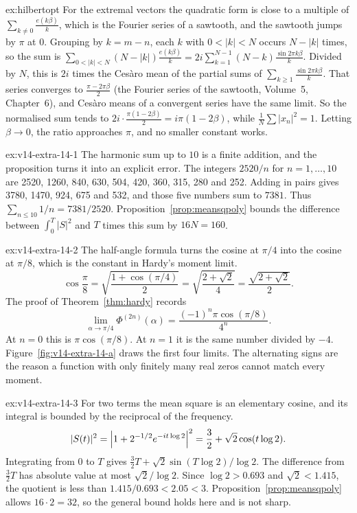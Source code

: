 \begin{solution}{ex:hilbertopt}
\idea For the extremal vectors the quadratic form is close to a multiple of $\sum_{k\ne0}\frac{e(k\beta)}k$, which is the Fourier series of a sawtooth, and the sawtooth jumps by $\pi$ at $0$.
\writeup Grouping by $k=m-n$, each $k$ with $0<|k|<N$ occurs $N-|k|$ times, so the sum is $\sum_{0<|k|<N}(N-|k|)\frac{e(k\beta)}k=2i\sum_{k=1}^{N-1}(N-k)\frac{\sin2\pi k\beta}k$. Divided by $N$, this is $2i$ times the Cesàro mean of the partial sums of $\sum_{k\ge1}\frac{\sin2\pi k\beta}k$. That series converges to $\frac{\pi-2\pi\beta}2$ (the Fourier series of the sawtooth, Volume~5, Chapter~6), and Cesàro means of a convergent series have the same limit. So the normalised sum tends to $2i\cdot\frac{\pi(1-2\beta)}2=i\pi(1-2\beta)$, while $\frac1N\sum|x_n|^2=1$. Letting $\beta\to0$, the ratio approaches $\pi$, and no smaller constant works.
\end{solution}

\begin{solution}{ex:v14-extra-14-1}
\idea The harmonic sum up to $10$ is a finite addition, and the proposition turns it into an explicit error.
\writeup The integers $2520/n$ for $n=1,\dots,10$ are 2520, 1260, 840, 630, 504, 420, 360, 315, 280 and 252. Adding in pairs gives 3780, 1470, 924, 675 and 532, and those five numbers sum to $7381$. Thus $\sum_{n\le10}1/n=7381/2520$. Proposition~\ref{prop:meansqpoly} bounds the difference between $\int_0^T|S|^2$ and $T$ times this sum by $16N=160$.
\end{solution}

\begin{solution}{ex:v14-extra-14-2}
\idea The half-angle formula turns the cosine at $\pi/4$ into the cosine at $\pi/8$, which is the constant in Hardy's moment limit.
\writeup 
\[
\cos\frac\pi8=\sqrt{\frac{1+\cos(\pi/4)}2}=\sqrt{\frac{2+\sqrt2}4}=\frac{\sqrt{2+\sqrt2}}2.
\]
The proof of Theorem~\ref{thm:hardy} records
\[
\lim_{\alpha\to\pi/4}\Phi^{(2n)}(\alpha)=\frac{(-1)^n\pi\cos(\pi/8)}{4^n}.
\]
At $n=0$ this is $\pi\cos(\pi/8)$. At $n=1$ it is the same number divided by $-4$. Figure~\ref{fig:v14-extra-14-a} draws the first four limits. The alternating signs are the reason a function with only finitely many real zeros cannot match every moment.
\end{solution}

\begin{solution}{ex:v14-extra-14-3}
\idea For two terms the mean square is an elementary cosine, and its integral is bounded by the reciprocal of the frequency.
\writeup 
\[
|S(t)|^2=\Bigl|1+2^{-1/2}e^{-it\log2}\Bigr|^2=\frac32+\sqrt2\cos(t\log2).
\]
Integrating from $0$ to $T$ gives $\frac32 T+\sqrt2\sin(T\log2)/\log2$. The difference from $\frac32 T$ has absolute value at most $\sqrt2/\log2$. Since $\log2>0.693$ and $\sqrt2<1.415$, the quotient is less than $1.415/0.693<2.05<3$. Proposition~\ref{prop:meansqpoly} allows $16\cdot2=32$, so the general bound holds here and is not sharp.
\end{solution}

